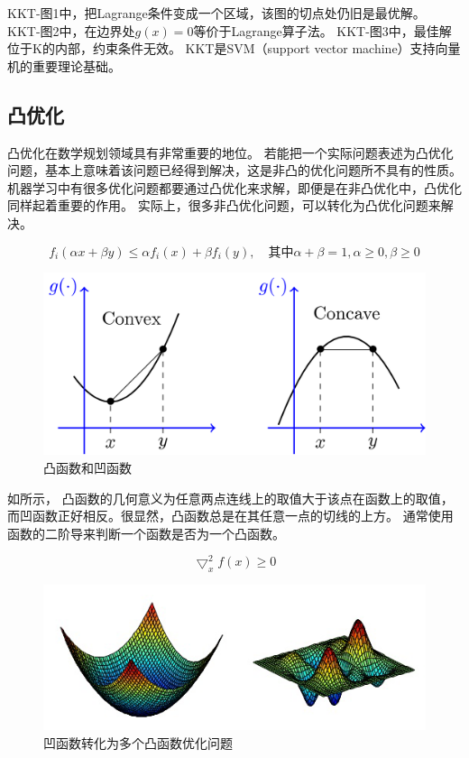 KKT-图1中，把Lagrange条件变成一个区域，该图的切点处仍旧是最优解。
KKT-图2中，在边界处$g(x)=0$等价于Lagrange算子法。
KKT-图3中，最佳解位于K的内部，约束条件无效。
KKT是SVM（support vector machine）支持向量机的重要理论基础。

\subsection{凸优化}
凸优化在数学规划领域具有非常重要的地位。
若能把一个实际问题表述为凸优化问题，基本上意味着该问题已经得到解决，这是非凸的优化问题所不具有的性质。
机器学习中有很多优化问题都要通过凸优化来求解，即便是在非凸优化中，凸优化同样起着重要的作用。
实际上，很多非凸优化问题，可以转化为凸优化问题来解决。

$$
f_i(\alpha x + \beta y) \le \alpha f_i(x) + \beta f_i(y),
\quad
\text{其中} \alpha + \beta = 1, \alpha \ge 0, \beta \ge 0
$$

\begin{figure}[!htb]
	\centerline{\includegraphics[width=.30\figwidth]{images/convex-concave.png}}
	\caption{凸函数和凹函数}
	\label{fig:part2_math_convex_concave}
\end{figure}

如所示，
凸函数的几何意义为任意两点连线上的取值大于该点在函数上的取值，
而凹函数正好相反。很显然，凸函数总是在其任意一点的切线的上方。
通常使用函数的二阶导来判断一个函数是否为一个凸函数。

$$
\bigtriangledown_x^2f(x) \ge 0
$$

\begin{figure}[!htb]
	\centerline{\includegraphics[width=.35\figwidth]{images/concave-to-convex.png}}
	\caption{凹函数转化为多个凸函数优化问题}
	\label{fig:part2_math_concave_to_convex}
\end{figure}

